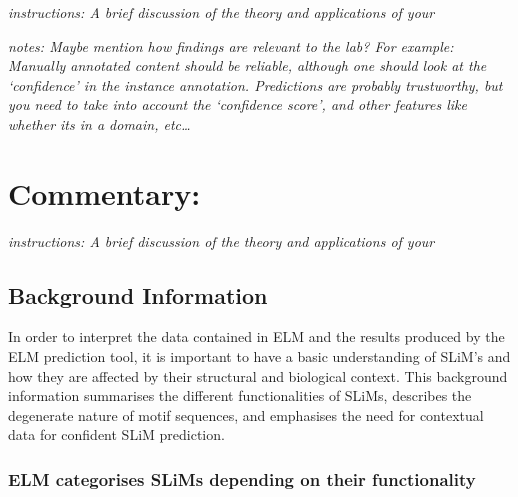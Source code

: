 \documentclass[12pt]{article}
\begin{document}
\emph{instructions: A brief discussion of the theory and applications of
your}

\emph{notes: Maybe mention how findings are relevant to the lab? For
example: Manually annotated content should be reliable, although one
should look at the `confidence' in the instance annotation. Predictions
are probably trustworthy, but you need to take into account the
`confidence score', and other features like whether its in a domain,
etc\ldots{}}

\section*{Commentary:}\label{commentary}

\emph{instructions: A brief discussion of the theory and applications of
your}

\subsection*{Background Information}\label{background-information}

In order to interpret the data contained in ELM and the results produced by the
ELM prediction tool, it is important to have a basic understanding of SLiM's
and how they are affected by their structural and biological context. This
background information summarises the different functionalities of SLiMs,
describes the degenerate nature of motif sequences, and emphasises the need for
contextual data for confident SLiM prediction.

\subsubsection*{ELM categorises SLiMs depending on their functionality}
\end{document}
